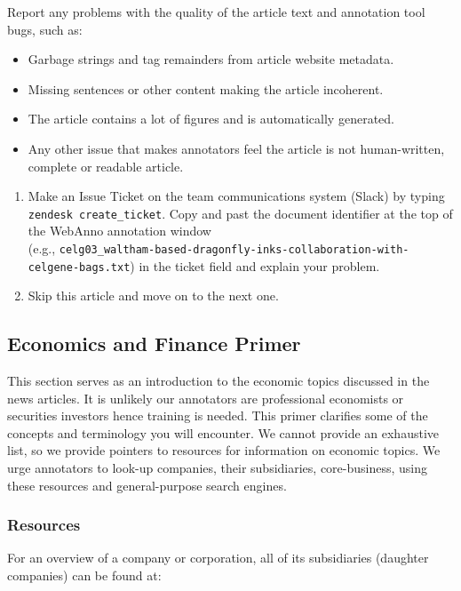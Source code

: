 \begin{itemize}[leftmargin=*]
        Report any problems with the quality of the article text and annotation tool bugs, such as:
        \begin{itemize}[noitemsep]
            \item Garbage strings and tag remainders from article website metadata.
            \item Missing sentences or other content making the article incoherent.
            \item The article contains a lot of figures and is automatically generated.
            \item Any other issue that makes annotators feel the article is not human-written, complete or readable article.
        \end{itemize}
        \begin{enumerate}
            \item Make an Issue Ticket on the team communications system (Slack) by typing \texttt{\\zendesk create\_ticket}.
            Copy and past the document identifier at the top of the WebAnno annotation window\\(e.g., \texttt{celg03\_waltham-based-dragonfly-inks-collaboration-with-celgene-bags.txt}) in the ticket field and explain your problem.
            \item Skip this article and move on to the next one.
        \end{enumerate}
\end{itemize}

\subsection{Economics and Finance Primer} \label{section:primer}
This section serves as an introduction to the economic topics discussed in the news articles.
It is unlikely our annotators are professional economists or securities investors hence training is needed.
This primer clarifies some of the concepts and terminology you will encounter.
We cannot provide an exhaustive list, so we provide pointers to resources for information on economic topics.
We urge annotators to look-up companies, their subsidiaries, core-business, using these resources and general-purpose search engines. 

\subsubsection{Resources}
For an overview of a company or corporation, all of its subsidiaries (daughter companies) can be found at:

